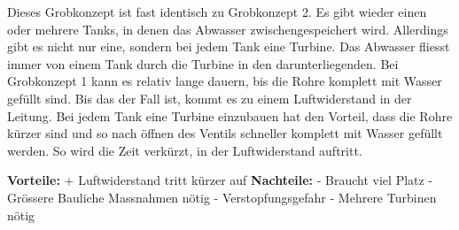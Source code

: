 Dieses Grobkonzept ist fast identisch zu Grobkonzept 2. Es gibt wieder einen oder mehrere Tanks, in denen das Abwasser zwischengespeichert wird. Allerdings gibt es nicht nur eine, sondern bei jedem Tank eine Turbine. Das Abwasser fliesst  immer von einem Tank durch die Turbine in den darunterliegenden. Bei Grobkonzept 1 kann es relativ lange dauern, bis die Rohre komplett mit Wasser gefüllt sind. Bis das der Fall ist, kommt es zu einem Luftwiderstand in der Leitung. Bei jedem Tank eine Turbine einzubauen hat den Vorteil, dass die Rohre kürzer sind und so nach öffnen des Ventils schneller komplett mit Wasser gefüllt werden. So wird die Zeit verkürzt, in der Luftwiderstand auftritt. 

\textbf{Vorteile:} 									\newline
+	Luftwiderstand tritt kürzer auf 				\newline
\textbf{Nachteile:}									\newline
-	Braucht viel Platz								\newline
-	Grössere Bauliche Massnahmen nötig				\newline
-	Verstopfungsgefahr								\newline
-	Mehrere Turbinen nötig				
\newpage